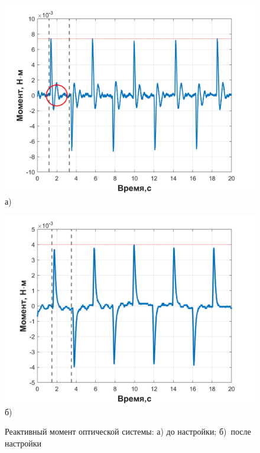 \begin{figure}[h!]
	\begin{minipage}[b]{0.49\linewidth}\centering
		\includegraphics[width=1\linewidth]{matlab/img/scanner_no_sinchron} \\ а)
	\end{minipage}
	\hfill
	\begin{minipage}[b]{0.49\linewidth}\centering
		\includegraphics[width=1\linewidth]{matlab/img/scanner_correct} \\ б)
	\end{minipage}
	\caption{Реактивный момент оптической системы: а) до настройки; б)~после настройки}
	\label{fig:scan-mom}
\end{figure}

